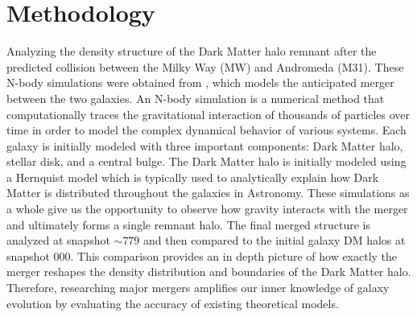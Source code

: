 \documentclass[fleqn,usenatbib]{mnras}
\begin{document}
\section{Methodology}
Analyzing the density structure of the Dark Matter halo remnant after the predicted collision between the Milky Way (MW) and Andromeda (M31). These N-body simulations were obtained from \citep{2012Van}, which models the anticipated merger between the two galaxies. An N-body simulation is a numerical method that computationally traces the gravitational interaction of thousands of particles over time in order to model the complex dynamical behavior of various systems. Each galaxy is initially modeled with three important components: Dark Matter halo, stellar disk, and a central bulge. The Dark Matter halo is initially modeled using a Hernquist model which is typically used to analytically explain how Dark Matter is distributed throughout the galaxies in Astronomy. These simulations as a whole give us the opportunity to observe how gravity interacts with the merger and ultimately forms a single remnant halo. The final merged structure is analyzed at snapshot $\sim 779$ and then compared to the initial galaxy DM halos at snapshot 000. This comparison provides an in depth picture of how exactly the merger reshapes the density distribution and boundaries of the Dark Matter halo. Therefore, researching major mergers amplifies our inner knowledge of galaxy evolution by evaluating the accuracy of existing theoretical models. 
\end{document}

